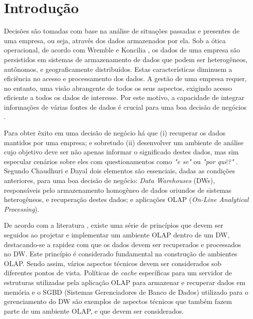 \chapter{Introdução}
\label{intro}

Decisões são tomadas com base na análise de situações passadas e presentes de uma empresa, ou seja, através dos dados armazenados por ela. Sob a ótica operacional, de acordo com Wremble e Koncilia \cite{wrembel2007data}, os dados de uma empresa são persistidos em sistemas de armazenamento 
de dados que podem ser heterogêneos, autônomos, e geograficamente distribuídos. Estas características diminuem a eficiência no acesso e processamento dos dados. 
A gestão de uma empresa requer, no entanto, uma visão abrangente de todos os seus aspectos, exigindo acesso eficiente a todos os dados de interesse. 
Por este motivo, a capacidade de integrar informações de várias fontes de dados é crucial para uma boa decisão de negócios \cite{wrembel2007data}.

Para obter êxito em uma decisão de negócio há que (i) recuperar os dados mantidos por uma empresa; e sobretudo 
(ii) desenvolver um ambiente de análise cujo objetivo deve ser não apenas informar o significado destes dados, 
mas sim especular cenários sobre eles com questionamentos como \textit{"e se"} ou \textit{"por quê?"} \cite{codd1998providing}. 
Segundo Chaudhuri e Dayal \cite{chaudhuri1997overview} dois elementos são essenciais, dadas as condições anteriores, para uma boa decisão de negócio: 
\textit{Data Warehouses} (DWs), responsáveis pelo armazenamento homogêneo de dados oriundos de sistemas heterogêneos, e recuperação destes dados; 
e aplicações OLAP (\textit{On-Line Analytical Processing}).

De acordo com a literatura \cite{wrembel2007data, codd1998providing, kimball2002dw}, existe uma série de princípios que devem ser seguidos ao projetar e implementar um ambiente OLAP dentro de um DW, destacando-se a rapidez com que os dados devem ser recuperados e processados no DW. Este princípio é considerado fundamental 
na construção de ambientes OLAP. Sendo assim, vários aspectos técnicos devem ser considerados sob diferentes pontos de vista. 
Políticas de \textit{cache} específicas para um servidor de estruturas utilizadas pela aplicação OLAP para armazenar e recuperar dados em memória 
e o SGBD (Sistemas Gerenciadores de Banco de Dados) utilizado para o gerenciamento do DW são exemplos de aspectos técnicos que também fazem parte de um ambiente OLAP, 
e que devem ser considerados. 

